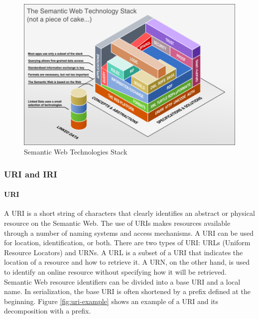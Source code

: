 \begin{figure}[h]
    \centering
    \includegraphics[scale=0.6]{images/foundation-sem-web-tech-stack.png}
    \caption{\label{fig:sem-web-stack} Semantic Web Technologies Stack }
\end{figure}


    \subsubsection{URI and IRI}
        \paragraph{URI}
        A URI is a short string of characters that clearly identifies an abstract or physical resource on the Semantic Web. The use of URIs makes resources available through a number of naming systems and access mechanisms. A URI can be used for location, identification, or both. There are two types of URI: URLs (Uniform Resource Locators) and URNs. A URL is a subset of a URI that indicates the location of a resource and how to retrieve it. A URN, on the other hand, is used to identify an online resource without specifying how it will be retrieved.\\

        Semantic Web resource identifiers can be divided into a base URI and a local name. In serialization, the base URI is often shortened by a prefix defined at the beginning. Figure \ref{fig:uri-example} shows an example of a URI and its decomposition with a prefix.\\

